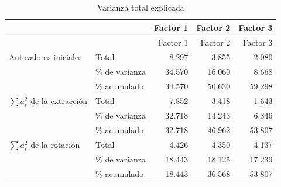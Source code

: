 \documentclass[
  10pt,
  spanish,
]{article}
\begin{document}
\begin{longtable}[]{@{}llrrr@{}}
\caption{Varianza total explicada\label{tab:tab_varexp}}\tabularnewline
\toprule
& & Factor 1 & Factor 2 & Factor 3\tabularnewline
\midrule
\endfirsthead
\toprule
& & Factor 1 & Factor 2 & Factor 3\tabularnewline
\midrule
\endhead
Autovalores iniciales & Total & 8.297 & 3.855 & 2.080\tabularnewline
& \% de varianza & 34.570 & 16.060 & 8.668\tabularnewline
& \% acumulado & 34.570 & 50.630 & 59.298\tabularnewline
\(\sum a_i^2\) de la extracción & Total & 7.852 & 3.418 &
1.643\tabularnewline
& \% de varianza & 32.718 & 14.243 & 6.846\tabularnewline
& \% acumulado & 32.718 & 46.962 & 53.807\tabularnewline
\(\sum a_i^2\) de la rotación & Total & 4.426 & 4.350 &
4.137\tabularnewline
& \% de varianza & 18.443 & 18.125 & 17.239\tabularnewline
& \% acumulado & 18.443 & 36.568 & 53.807\tabularnewline
\bottomrule
\end{longtable}
\end{document}
